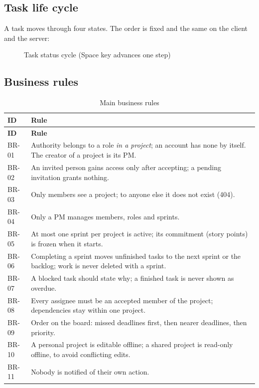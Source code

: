 \documentclass[../main.tex]{subfiles}
\begin{document}
\subsection{Task life cycle}
A task moves through four states. The order is fixed and the same on the client and the server:
\begin{figure}[H]
\centering
{}
\caption{Task status cycle (Space key advances one step)}\label{fig:taskcycle}
\end{figure}

\subsection{Business rules}
\begin{longtable}{|p{1.3cm}|p{12.4cm}|}
\caption{Main business rules}\label{tab:rules}\\
\hline
\textbf{ID} & \textbf{Rule} \\ \hline
\endfirsthead
\hline
\textbf{ID} & \textbf{Rule} \\ \hline
\endhead
BR-01 & Authority belongs to a role \emph{in a project}; an account has none by itself. The creator of a project is its PM. \\ \hline
BR-02 & An invited person gains access only after accepting; a pending invitation grants nothing. \\ \hline
BR-03 & Only members see a project; to anyone else it does not exist (404). \\ \hline
BR-04 & Only a PM manages members, roles and sprints. \\ \hline
BR-05 & At most one sprint per project is active; its commitment (story points) is frozen when it starts. \\ \hline
BR-06 & Completing a sprint moves unfinished tasks to the next sprint or the backlog; work is never deleted with a sprint. \\ \hline
BR-07 & A blocked task should state why; a finished task is never shown as overdue. \\ \hline
BR-08 & Every assignee must be an accepted member of the project; dependencies stay within one project. \\ \hline
BR-09 & Order on the board: missed deadlines first, then nearer deadlines, then priority. \\ \hline
BR-10 & A personal project is editable offline; a shared project is read-only offline, to avoid conflicting edits. \\ \hline
BR-11 & Nobody is notified of their own action. \\ \hline
\end{longtable}
\end{document}
